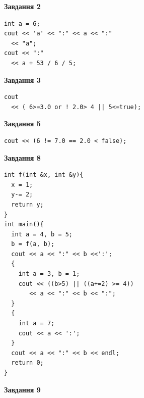 \documentclass[12pt, ukrainian]{article}
\begin{document}
{\begin {large}
\begin{minipage}[t]{7.0cm}
\end{minipage}
\vline \hspace{1mm}
\begin{minipage}[t]{11.0cm}

\begin{center}
\textbf{Завдання 2}
\end{center}
\vspace{-8mm}

\begin{verbatim}
int a = 6;
cout << 'a' << ":" << a << ":" 
  << "a";
cout << ":" 
  << a + 53 / 6 / 5;
\end{verbatim}



\begin{center}
\textbf{Завдання 3}
\end{center}
\vspace{-8mm}

\begin{verbatim}
cout 
  << ( 6>=3.0 or ! 2.0> 4 || 5<=true);
\end{verbatim}



\begin{center}
\textbf{Завдання 5}
\end{center}
\vspace{-8mm}

\begin{verbatim}
cout << (6 != 7.0 == 2.0 < false);
\end{verbatim}



\begin{center}
\textbf{Завдання 8}
\end{center}
\vspace{-8mm}

\begin{verbatim}
int f(int &x, int &y){
  x = 1;
  y-= 2;
  return y;
}
int main(){
  int a = 4, b = 5;
  b = f(a, b);
  cout << a << ":" << b <<':';
  {
    int a = 3, b = 1;
    cout << ((b>5) || ((a+=2) >= 4))
       << a << ":" << b << ":";
  }
  {
    int a = 7;
    cout << a << ':';
  }
  cout << a << ":" << b << endl;
  return 0;
}
\end{verbatim}

\end{minipage}


\begin{minipage}[t]{7.0cm}

\begin{center}
\textbf{Завдання 9}
\end{center}
\vspace{-8mm}


\end{minipage}
\end{large}}
\end{document}
